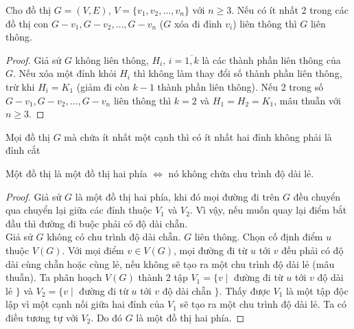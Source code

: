 \begin{proposition}
	Cho đồ thị $G = (V,E)$, $V=\{v_1, v_2,\ldots,v_n\}$ với $n \ge 3$. Nếu có ít nhất 2 trong các đồ thị con $G-v_1,G-v_2,\ldots,G-v_n$ ($G$ xóa đi đỉnh $v_i$) liên thông thì $G$ liên thông.
	\begin{proof}
		Giả sử $G$ không liên thông, $H_i,\, i = \overline{1,k}$ là các thành phần liên thông của $G$. Nếu xóa một đỉnh khỏi $H_i$ thì không làm thay đổi số thành phần liên thông, trừ khi $H_i = K_1$ (giảm đi còn $k-1$ thành phần liên thông). Nếu 2 trong số $G-v_1,G-v_2,\ldots,G-v_n$ liên thông thì $k = 2$ và $H_1 = H_2 = K_1$, mâu thuẫn với $n \ge 3$.
	\end{proof}
\end{proposition}

\begin{corolarry} Mọi đồ thị $G$ mà chứa ít nhất một cạnh thì có ít nhất hai đỉnh không phải là đỉnh cắt\end{corolarry}
\begin{theorem}
Một đồ thị là một đồ thị hai phía $\iff$ nó không chứa chu trình độ dài lẻ.	
\begin{proof}
	Giả sử $G$ là một đồ thị hai phía, khi đó mọi đường đi trên $G$ đều chuyển qua chuyển lại giữa các đỉnh thuộc $V_1$ và $V_2$. Vì vậy, nếu muốn quay lại điểm bắt đầu thì đường đi buộc phải có độ dài chẵn.\\
	Giả sử $G$ không có chu trình độ dài chẵn. $G$ liên thông. Chọn cố định điểm $u$ thuộc $V(G)$. Với mọi điểm $v \in V(G)$, mọi đường đi từ $u$ tới $v$ đều phải có độ dài cùng chẵn hoặc cùng lẻ, nếu không sẽ tạo ra một chu trình độ dài lẻ (mâu thuẫn). Ta phân hoạch $V(G)$ thành 2 tập $V_1 = \{v\mid$ đường đi từ $u$ tới $v$ độ dài lẻ $\}$ và $V_2 = \{v\mid$ đường đi từ $u$ tới $v$ độ dài chẵn $\}$. Thấy được $V_1$ là một tập độc lập vì một cạnh nối giữa hai đỉnh của $V_1$ sẽ tạo ra một chu trình độ dài lẻ. Ta có điều tương tự với $V_2$. Do đó $G$ là một đồ thị hai phía.
\end{proof}
\end{theorem}


